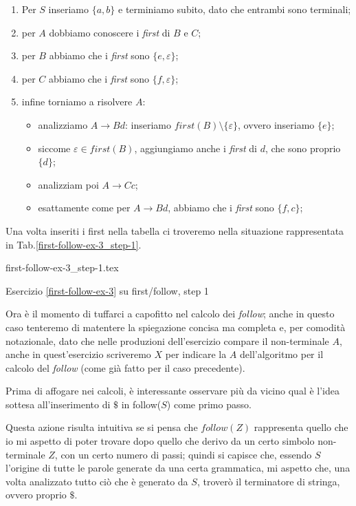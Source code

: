 \documentclass[class=book, crop=false, oneside, 12pt]{standalone}
\begin{document}
\begin{enumerate}
    \item Per \(S\) inseriamo \(\{a, b\}\) e terminiamo subito, dato che entrambi sono terminali;
    \item per \(A\) dobbiamo conoscere i \emph{first} di \(B\) e \(C\);
    \item per \(B\) abbiamo che i \emph{first} sono \(\{e, \varepsilon\}\);
    \item per \(C\) abbiamo che i \emph{first} sono \(\{f, \varepsilon\}\);
    \item infine torniamo a risolvere \(A\):
    \begin{itemize}
        \item analizziamo \(A \to Bd\): inseriamo \(first(B) \setminus \{\varepsilon\}\), ovvero inseriamo \(\{e\}\);
        \item siccome \(\varepsilon \in first(B)\), aggiungiamo anche i \emph{first} di \(d\), che sono proprio \(\{d\}\);
        \item analizziam poi \(A \to Cc\);
        \item esattamente come per \(A \to Bd\), abbiamo che i \emph{first} sono \(\{f, c\}\);
    \end{itemize}
\end{enumerate}
Una volta inseriti i first nella tabella ci troveremo nella situazione rappresentata in Tab.\ref{first-follow-ex-3_step-1}.
\begin{table}[H]
	\centering
	{first-follow-ex-3_step-1.tex}
    \caption{Esercizio \ref{first-follow-ex-3} su first/follow, step 1}
    \label{first-follow-ex-3_step-1}
\end{table}
Ora è il momento di tuffarci a capofitto nel calcolo dei \emph{follow}; anche in questo caso tenteremo di matentere la spiegazione concisa ma completa e, per comodità notazionale, dato che nelle produzioni dell'esercizio compare il non-terminale \(A\), anche in quest'esercizio scriveremo \(X\) per indicare la \(A\) dell'algoritmo per il calcolo del \emph{follow} (come già fatto per il caso precedente). 

Prima di affogare nei calcoli, è interessante osservare più da vicino qual è l’idea sottesa all'inserimento di \(\$\) in follow(\(S\)) come primo passo.

Questa azione risulta intuitiva se si pensa che \(follow(Z)\) rappresenta quello che io mi aspetto di poter trovare dopo quello che derivo da un certo simbolo non-terminale \(Z\), con un certo numero di passi; quindi si capisce che, essendo \(S\) l’origine di tutte le parole generate da una certa grammatica, mi aspetto che, una volta analizzato tutto ciò che è generato da \(S\), troverò il terminatore di stringa, ovvero proprio \(\$\).
\end{document}
